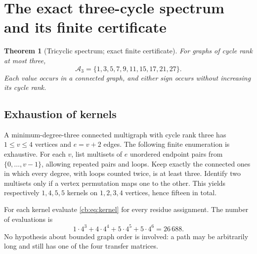 \documentclass[11pt]{article}
\numberwithin{equation}{section}
\newtheorem{theorem}{Theorem}[section]
\theoremstyle{definition}
\begin{document}
\section{The exact three-cycle spectrum and its finite certificate}\label{cb:sec:tricyclic}

\begin{theorem}[Tricyclic spectrum; exact finite certificate]\label{cb:thm:tricyclic}
For graphs of cycle rank at most three,
\begin{equation}\label{cb:eq:tricyclic}
 \mathcal A_3=\{1,3,5,7,9,11,15,17,21,27\}.
\end{equation}
Each value occurs in a connected graph, and either sign occurs without
increasing its cycle rank.
\end{theorem}

\subsection{Exhaustion of kernels}
A minimum-degree-three connected multigraph with cycle rank three has
$1\le v\le4$ vertices and $e=v+2$ edges. The following finite enumeration
is exhaustive. For each $v$, list multisets of $e$ unordered endpoint
pairs from $\{0,\ldots,v-1\}$, allowing repeated pairs and loops. Keep
exactly the connected ones in which every degree, with loops counted twice,
is at least three. Identify two multisets only if a vertex permutation
maps one to the other. This yields respectively $1,4,5,5$ kernels on
$1,2,3,4$ vertices, hence fifteen in total.

For each kernel evaluate \eqref{cb:eq:kernel} for every residue assignment.
The number of evaluations is
\[
 1\cdot4^3+4\cdot4^4+5\cdot4^5+5\cdot4^6=26\,688.
\]
No hypothesis about bounded graph order is involved: a path may be
arbitrarily long and still has one of the four transfer matrices.
\end{document}
